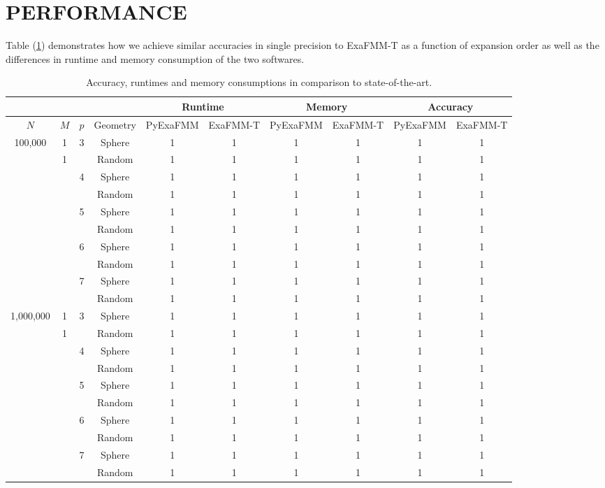 \documentclass{IEEEcsmag}
\begin{document}
\section{PERFORMANCE}

Table (\ref{tab:performance}) demonstrates how we achieve similar accuracies in single precision to ExaFMM-T as a function of expansion order as well as the differences in runtime and memory consumption of the two softwares.

\begin{table}[t]
	\centering
	\caption{Accuracy, runtimes and memory consumptions in comparison to state-of-the-art.}
	\begin{tabular}{|*{10}{c|}}
		\hline
		& & &   & \multicolumn{2}{c|}{Runtime} & \multicolumn{2}{c|}{Memory} & \multicolumn{2}{c|}{Accuracy}\\
		\hline
		$N$ & $M$ &$p$ &  Geometry   &   PyExaFMM  &  ExaFMM-T &    PyExaFMM  &  ExaFMM-T  &   PyExaFMM  &  ExaFMM-T\\
		\hline
		100,000 & 1 & 3   &   Sphere  &  1 &    1  &  1  &   1  & 1 & 1\\
		 & 1 &    &   Random  &  1 &    1  &  1  &   1  & 1 & 1\\
		 &  & 4   &   Sphere  &  1 &    1  &  1  &   1  & 1 & 1\\
		 &  &    &   Random  &  1 &    1  &  1  &   1  & 1 & 1\\
		 &  & 5   &   Sphere  &  1 &    1  &  1  &   1  & 1 & 1\\
		 &  &    &   Random  &  1 &    1  &  1  &   1  & 1 & 1\\
		 &  & 6   &   Sphere  &  1 &    1  &  1  &   1  & 1 & 1\\
		 &  &    &   Random  &  1 &    1  &  1  &   1  & 1 & 1\\
		 &  & 7   &   Sphere  &  1 &    1  &  1  &   1  & 1 & 1\\
		 &  &    &   Random  &  1 &    1  &  1  &   1  & 1 & 1\\
		1,000,000 & 1 & 3   &   Sphere  &  1 &    1  &  1  &   1  & 1 & 1\\
		 & 1 &    &   Random  &  1 &    1  &  1  &   1  & 1 & 1\\
		 &  & 4   &   Sphere  &  1 &    1  &  1  &   1  & 1 & 1\\
		 &  &    &   Random  &  1 &    1  &  1  &   1  & 1 & 1\\
		&  & 5   &   Sphere  &  1 &    1  &  1  &   1  & 1 & 1\\
		 &  &    &   Random  &  1 &    1  &  1  &   1  & 1 & 1\\
		 &  & 6   &   Sphere  &  1 &    1  &  1  &   1  & 1 & 1\\
		 &  &    &   Random  &  1 &    1  &  1  &   1  & 1 & 1\\
		 &  & 7   &   Sphere  &  1 &    1  &  1  &   1  & 1 & 1\\
		 &  &    &   Random  &  1 &    1  &  1  &   1  & 1 & 1\\
		\hline
	\end{tabular}
	\label{tab:performance}
 \end{table}
\end{document}
